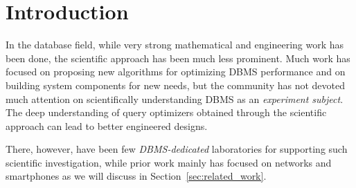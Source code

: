 \documentclass{vldb}
\def\azdb{\hbox{\sc AZDBLab}}
\begin{document}
\section{Introduction}\label{sec:intro}
In the database field, while very strong mathematical and engineering work has been done, the 
scientific approach has been much less prominent. 
Much work has focused on \linebreak \hbox{proposing} new algorithms for optimizing DBMS performance 
and on building system components for new needs, but the \hbox{community} has not devoted 
much attention on \hbox{scientifically} understanding \hbox{DBMS} as an {\em experiment subject}. 
The deep understanding of query optimizers obtained through the \linebreak \hbox{scientific} approach 
can lead to better engineered designs.

There, however, have been few {\em DBMS-dedicated} \linebreak \hbox{laboratories}
for supporting such \hbox{scientific} \hbox{investigation}, while prior work mainly has focused on 
\hbox{networks} and smartphones as we will discuss in Section~\ref{sec:related_work}.
\end{document}
